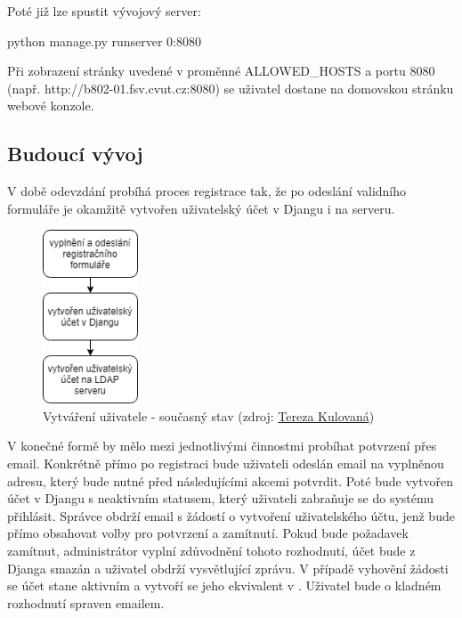 Poté již lze spustit vývojový server:

\begin{center}
\textsf{python manage.py runserver 0:8080}
\end{center}

Při zobrazení stránky uvedené v proměnné \textsf{ALLOWED\_HOSTS} a portu 8080 (např. http://b802-01.fsv.cvut.cz:8080) se uživatel dostane na domovskou stránku webové konzole. 

\subsection{Budoucí vývoj}
\label{python-knihovna}

V době odevzdání probíhá proces registrace tak, že po odeslání validního formuláře je okamžitě vytvořen uživatelský účet v Djangu i na  serveru.

\begin{figure}[H] \centering
    \includegraphics[width=80pt]{./pictures/my_console_current_version_cz.png}
    \caption[Vytváření uživatele - současný stav]{Vytváření uživatele - současný stav (zdroj:
	\href{}{Tereza Kulovaná})}
    \label{fig:admin-current}
\end{figure}
  
V konečné formě by mělo mezi jednotlivými činnostmi probíhat potvrzení přes email. Konkrétně přímo po registraci bude uživateli odeslán email na vyplněnou adresu, který bude nutné před následujícími akcemi potvrdit. Poté bude vytvořen účet v Djangu s neaktivním statusem, který uživateli zabraňuje se do systému přihlásit. Správce obdrží email s žádostí o vytvoření uživatelského účtu, jenž bude přímo obsahovat volby pro potvrzení a zamítnutí. Pokud bude požadavek zamítnut, administrátor vyplní zdůvodnění tohoto rozhodnutí, účet bude z Djanga smazán a uživatel obdrží vysvětlující zprávu. V případě vyhovění žádosti se účet stane aktivním a vytvoří se jeho ekvivalent v . Uživatel bude o kladném rozhodnutí spraven emailem.
  
